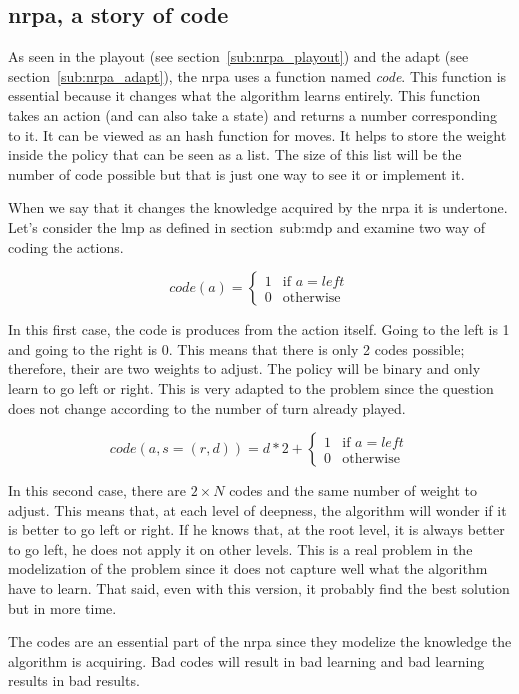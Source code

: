 \subsection{\acrshort{nrpa}, a story of code}%
\label{sub:nrpa_a_story_of_code}

As seen in the playout (see section~\ref{sub:nrpa_playout}) and the adapt (see section~\ref{sub:nrpa_adapt}), the \gls{nrpa} uses a function named \textit{code}.
This function is essential because it changes what the algorithm learns entirely.
This function takes an action (and can also take a state) and returns a number corresponding to it.
It can be viewed as an hash function for moves.
It helps to store the weight inside the policy that can be seen as a list.
The size of this list will be the number of code possible but that is just one way to see it or implement it.

When we say that it changes the knowledge acquired by the \gls{nrpa} it is undertone.
Let's consider the \gls{lmp} as defined in section~{sub:mdp} and examine two way of coding the actions.

\[
    code(a)= 
    \begin{cases}
        1 & \text{if } a = left\\
        0 & \text{otherwise }
    \end{cases}
\]

In this first case, the code is produces from the action itself.
Going to the left is 1 and going to the right is 0.
This means that there is only 2 codes possible; therefore, their are two weights to adjust.
The policy will be binary and only learn to go left or right.
This is very adapted to the problem since the question does not change according to the number of turn already played.

\[
    code(a, s=(r, d)) = d*2 + 
    \begin{cases}
        1 & \text{if } a = left\\
        0 & \text{otherwise }
    \end{cases}
\]

In this second case, there are \(2 \times N\) codes and the same number of weight to adjust.
This means that, at each level of deepness, the algorithm will wonder if it is better to go left or right.
If he knows that, at the root level, it is always better to go left, he does not apply it on other levels.
This is a real problem in the modelization of the problem since it does not capture well what the algorithm have to learn.
That said, even with this version, it probably find the best solution but in more time.

The codes are an essential part of the \gls{nrpa} since they modelize the knowledge the algorithm is acquiring.
Bad codes will result in bad learning and bad learning results in bad results.

